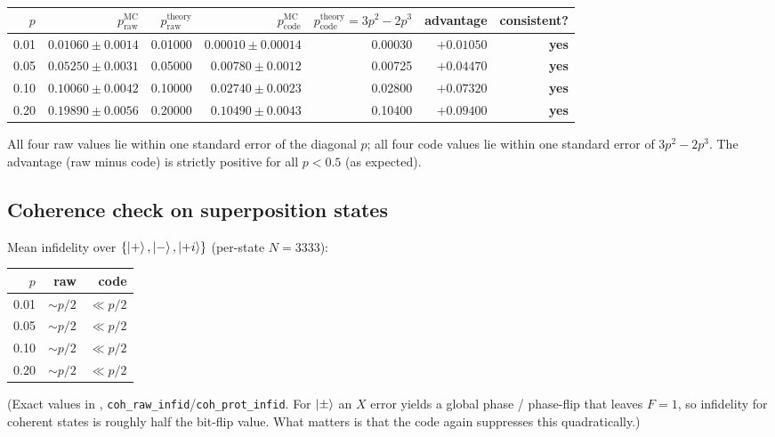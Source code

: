 \documentclass[11pt]{article}
\begin{document}
\begin{center}
\begin{tabular}{@{}rrrrrrr@{}}
\toprule
$p$ & $p_{\text{raw}}^{\text{MC}}$ & $p_{\text{raw}}^{\text{theory}}$ &
$p_{\text{code}}^{\text{MC}}$ & $p_{\text{code}}^{\text{theory}}=3p^{2}-2p^{3}$ &
advantage & consistent? \\
\midrule
0.01 & $0.01060\pm 0.0014$ & 0.01000 & $0.00010\pm 0.00014$ & 0.00030 & $+0.01050$ & \textbf{yes} \\
0.05 & $0.05250\pm 0.0031$ & 0.05000 & $0.00780\pm 0.0012$  & 0.00725 & $+0.04470$ & \textbf{yes} \\
0.10 & $0.10060\pm 0.0042$ & 0.10000 & $0.02740\pm 0.0023$  & 0.02800 & $+0.07320$ & \textbf{yes} \\
0.20 & $0.19890\pm 0.0056$ & 0.20000 & $0.10490\pm 0.0043$  & 0.10400 & $+0.09400$ & \textbf{yes} \\
\bottomrule
\end{tabular}
\end{center}

All four raw values lie within one standard error of the diagonal $p$; all
four code values lie within one standard error of $3p^{2}-2p^{3}$.
The advantage (raw minus code) is strictly positive for all $p<0.5$ (as
expected).

\subsection{Coherence check on superposition states}
Mean infidelity over $\{\ket{+},\ket{-},\ket{{+}i}\}$ (per-state $N=3333$):

\begin{center}
\begin{tabular}{@{}rrr@{}}
\toprule
$p$ & raw & code \\
\midrule
0.01 & $\sim p/2$ & $\ll p/2$ \\
0.05 & $\sim p/2$ & $\ll p/2$ \\
0.10 & $\sim p/2$ & $\ll p/2$ \\
0.20 & $\sim p/2$ & $\ll p/2$ \\
\bottomrule
\end{tabular}
\end{center}
(Exact values in ,
\texttt{coh\_raw\_infid}/\texttt{coh\_prot\_infid}.  For $\ket{\pm}$ an
$X$ error yields a global phase / phase-flip that leaves $F=1$, so
infidelity for coherent states is roughly half the bit-flip value.  What
matters is that the code again suppresses this quadratically.)
\end{document}
